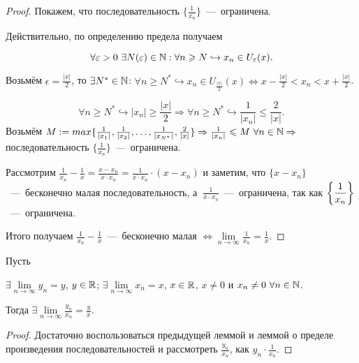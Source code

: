 \begin{proof}
    Покажем, что последовательность $\{ \frac{1}{x_{n}} \}$~---~ограничена.

    Действительно, по определению предела получаем

    $$\forall \varepsilon > 0 \  \exists N (\varepsilon) \in \mathbb{N}: \forall n \geqslant N \hookrightarrow x_{n} \in U_{\varepsilon} (x).$$

    Возьмём $\epsilon = \frac{|x|}{2}$, то $\exists N^{*} \in \mathbb{N}$: $\forall n \geq N^{*} \hookrightarrow x_{n} \in U_{\frac{|x|}{2}} (x) \Leftrightarrow x - \frac{|x|}{2} < x_{n} < x + \frac{|x|}{2}$.

    $$\forall n \geq N^{*} \hookrightarrow |x_{n}| \geq \frac{|x|}{2} \Rightarrow \forall n \geq N^{*} \hookrightarrow \frac{1}{|x_{n}|} \leq \frac{2}{|x|}.$$
    Возьмём $M := max \{ \frac{1}{|x_{1}|}, \frac{1}{|x_{2}|}, \ldots, \frac{1}{|x_{N^{*}}|}, \frac{2}{|x|}\} \Rightarrow \frac{1}{|x_{n}|} \leqslant M \  \forall n \in \mathbb{N} \Rightarrow$ последовательность $\{ \frac{1}{x_{n}} \}$~---~ограничена.

    Рассмотрим $\displaystyle \frac{1}{x_{n}} - \frac{1}{x} = \frac{x - x_{n}}{x \cdot x_{n}} = \frac{1}{x \cdot x_{n}} \cdot (x - x_{n})$ и заметим, что $\{ x - x_{n} \}$~---~бесконечно малая последовательность, а $\ \displaystyle \frac{1}{x \cdot x_{n}}$~---~ограничена, так как $\displaystyle \left\{{1 \over x_{n}}\right\}$~---~ограничена.

    Итого получаем $\displaystyle \frac{1}{x_{n}} - \frac{1}{x}$~---~бесконечно малая $\displaystyle \Leftrightarrow \lim\limits_{n\to \infty} \frac{1}{x_{n}} = \frac{1}{x}$.
\end{proof}
\begin{corollary}
    \hypertarget{corollemm2.6}{Пусть} $\exists \lim\limits_{n\to \infty} y_{n} = y$, $y \in \mathbb{R}$; $\exists \lim\limits_{n\to \infty} x_{n} = x$, $x \in \mathbb{R}$, $x \neq 0$ и $x_{n} \neq 0 \  \forall n \in \mathbb{N}$.

    Тогда $\displaystyle \exists \lim\limits_{n\to \infty} \frac{y_{n}}{x_{n}} = \frac{y}{x}$.
\end{corollary}
\begin{proof}
    Достаточно воспользоваться предыдущей леммой и леммой о пределе произведения последовательностей и рассмотреть $\displaystyle \frac{y_{n}}{x_{n}}$, как $\displaystyle y_{n} \cdot \frac{1}{x_{n}} .$
\end{proof}
